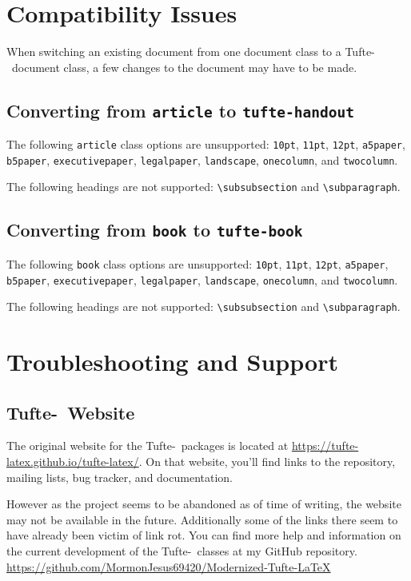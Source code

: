 \documentclass[a4paper]{tufte-handout}
\newcommand{\TL}{Tufte-\hologo{LaTeX}\xspace}
\newcommand{\hlorange}[1]{\textcolor{tufte-orange}{#1}}
\newcommand{\doccmd}[1]{\hlorange{\texttt{\textbackslash#1}}}
\newcommand{\doccls}[1]{\texttt{#1}}
\newcommand{\docclsopt}[1]{\hlorange{\texttt{#1}}}
\begin{document}
\chapter{Compatibility Issues}\label{ch:compatibility}
When switching an existing document from one document class to a \TL\ document class, a few changes to the document may have to be made.


\section{Converting from \doccls{article} to \doccls{tufte-handout}}\label{sec:article-to-handout}
The following \doccls{article} class options are unsupported: \docclsopt{10pt}, \docclsopt{11pt}, \docclsopt{12pt}, \docclsopt{a5paper}, \docclsopt{b5paper}, \docclsopt{executivepaper}, \docclsopt{legalpaper}, \docclsopt{landscape}, \docclsopt{onecolumn}, and \doccls{twocolumn}.

The following headings are not supported: \doccmd{subsubsection} and \doccmd{subparagraph}.


\section{Converting from \doccls{book} to \doccls{tufte-book}}\label{sec:book-to-tufte-book}
The following \doccls{book} class options are unsupported: \docclsopt{10pt}, \docclsopt{11pt}, \docclsopt{12pt}, \docclsopt{a5paper}, \docclsopt{b5paper}, \docclsopt{executivepaper}, \docclsopt{legalpaper}, \docclsopt{landscape}, \docclsopt{onecolumn}, and \doccls{twocolumn}.

The following headings are not supported: \doccmd{subsubsection} and \doccmd{subparagraph}.


\chapter{Troubleshooting and Support}\label{ch:troubleshooting}
\section{\TL\ Website}\label{sec:website}
The original website for the \TL\ packages is located at \url{https://tufte-latex.github.io/tufte-latex/}.
On that website, you'll find links to the  repository, mailing lists, bug tracker, and documentation.

However as the project seems to be abandoned as of time of writing, the website may not be available in the future.
Additionally some of the links there seem to have already been victim of link rot.
You can find more help and information on the current development of the \TL\ classes at my GitHub repository.
\url{https://github.com/MormonJesus69420/Modernized-Tufte-LaTeX}
\end{document}
